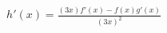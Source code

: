 \documentclass[preview]{standalone}
\begin{document}
\begin{align*}
h'(x) = \frac{(3x) f'(x) - f(x) g'(x)} {(3x)^2}
\end{align*}
\end{document}
